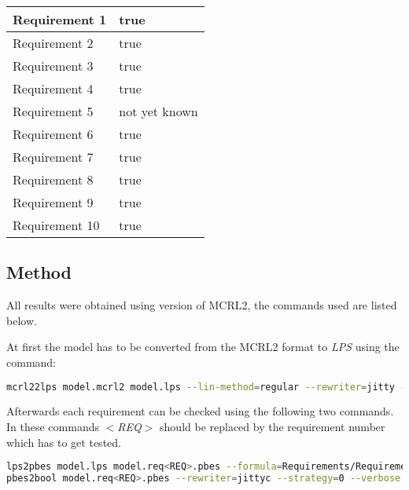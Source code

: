 \cbstart

\begin{tabular}{|l|l|}
\hline
Requirement 1 & true \\
\hline
Requirement 2 & true \\
\hline
Requirement 3 & true \\
\hline
Requirement 4 & true \\
\hline
Requirement 5 & not yet known \\
\hline
Requirement 6 & true \\
\hline
Requirement 7 & true \\
\hline
Requirement 8 & true \\
\hline
Requirement 9 & true \\
\hline
Requirement 10 & true \\
\hline
\end{tabular}

\subsection{Method}
All results were obtained using version  of MCRL2, the commands used are listed below.

At first the model has to be converted from the MCRL2 format to \emph{LPS} using the command:
\begin{lstlisting}[language=bash]
mcrl22lps model.mcrl2 model.lps --lin-method=regular --rewriter=jitty --verbose
\end{lstlisting}

Afterwards each requirement can be checked using the following two commands. In these commands \emph{$<$REQ$>$} should be replaced by the requirement number which has to get tested.

\begin{lstlisting}[language=bash]
lps2pbes model.lps model.req<REQ>.pbes --formula=Requirements/Requirement<REQ>.mcf --verbose
pbes2bool model.req<REQ>.pbes --rewriter=jittyc --strategy=0 --verbose
\end{lstlisting}

\cbend